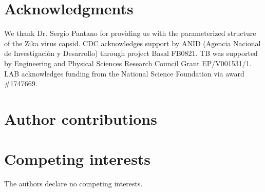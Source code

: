 \documentclass[twocolumn]{article}
\begin{document}
{}


\section*{Acknowledgments}
We thank Dr. Sergio Pantano for providing us with the parameterized structure of the Zika virus capsid.
CDC acknowledges support by ANID (Agencia Nacional de Investigaci\'{o}n y Desarrollo) through project Basal FB0821.
TB was supported by Engineering and Physical Sciences Research Council Grant EP/V001531/1.
LAB acknowledges funding from the National Science Foundation via award \#1747669.

\section*{Author contributions}

\section*{Competing interests}
The authors declare no competing interests.
\end{document}
